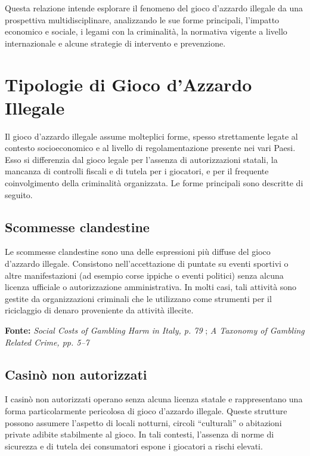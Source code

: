 \documentclass[a4paper,12pt]{article}
\begin{document}
Questa relazione intende esplorare il fenomeno del gioco d’azzardo illegale da una prospettiva multidisciplinare, analizzando le sue forme principali, l’impatto economico e sociale, i legami con la criminalità, la normativa vigente a livello internazionale e alcune strategie di intervento e prevenzione.


\section{Tipologie di Gioco d'Azzardo Illegale}

Il gioco d'azzardo illegale assume molteplici forme, spesso strettamente legate al contesto socioeconomico e al livello di regolamentazione presente nei vari Paesi. Esso si differenzia dal gioco legale per l’assenza di autorizzazioni statali, la mancanza di controlli fiscali e di tutela per i giocatori, e per il frequente coinvolgimento della criminalità organizzata. Le forme principali sono descritte di seguito.

\subsection{Scommesse clandestine}

Le scommesse clandestine sono una delle espressioni più diffuse del gioco d’azzardo illegale. Consistono nell’accettazione di puntate su eventi sportivi o altre manifestazioni (ad esempio corse ippiche o eventi politici) senza alcuna licenza ufficiale o autorizzazione amministrativa. In molti casi, tali attività sono gestite da organizzazioni criminali che le utilizzano come strumenti per il riciclaggio di denaro proveniente da attività illecite.

\textbf{Fonte:} \textit{Social Costs of Gambling Harm in Italy, p. 79} \cite{lucchini2022socialcosts}; \textit{A Taxonomy of Gambling Related Crime, pp. 5--7} \cite{banks2018taxonomy}

\subsection{Casinò non autorizzati}

I casinò non autorizzati operano senza alcuna licenza statale e rappresentano una forma particolarmente pericolosa di gioco d’azzardo illegale. Queste strutture possono assumere l’aspetto di locali notturni, circoli “culturali” o abitazioni private adibite stabilmente al gioco. In tali contesti, l’assenza di norme di sicurezza e di tutela dei consumatori espone i giocatori a rischi elevati.
\end{document}
